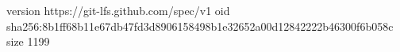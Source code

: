 version https://git-lfs.github.com/spec/v1
oid sha256:8b1ff68b11e67db47fd3d8906158498b1e32652a00d12842222b46300f6b058c
size 1199
